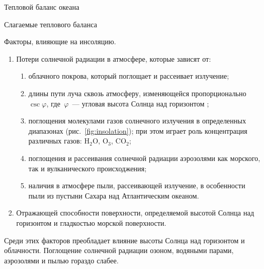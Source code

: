\begin{chapter}{Тепловой баланс океана}
\begin{section}{Слагаемые теплового баланса}
\begin{paragraph}{Факторы, влияющие на инсоляцию.}
\begin{enumerate}
\item
Потери солнечной радиации в атмосфере, которые зависят от:
\begin{enumerate}
   \item облачного покрова, который поглощает и рассеивает излучение; 
   \item длины пути луча сквозь атмосферу, изменяющейся 
         пропорционально~$\csc \varphi$, где~$\varphi$~--- угловая
         высота Солнца над горизонтом ;
   \item поглощения молекулами газов солнечного излучения в определенных 
         диапазонах (рис.~\ref{fig:insolation}); при этом играет роль 
         концентрация различных
         газов: $\text{H}_2\text{O}$, $\text{O}_3$, $\text{CO}_2$;
   \item поглощения и рассеивания солнечной радиации аэрозолями 
         как морского, так и вулканического происходжения;
   \item наличия в атмосфере пыли, рассеивающей излучение, в особенности
         пыли из пустыни Сахара над Атлантическим океаном.
\end{enumerate}
%

\item
Отражающей способности поверхности, определяемой высотой Солнца над горизонтом
и гладкостью морской поверхности.
%
\end{enumerate}
Среди этих факторов преобладает влияние высоты Солнца над горизонтом и 
облачности. Поглощение солнечной радиации озоном, водяными парами, аэрозолями
и пылью гораздо слабее.
% 


\end{paragraph}
\end{section}
\end{chapter}

